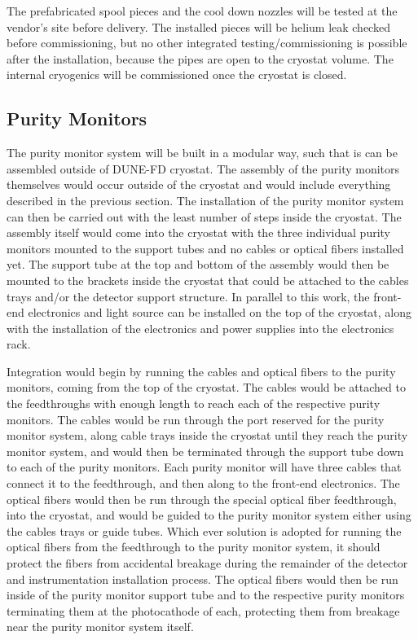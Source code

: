 The prefabricated spool pieces and the cool down nozzles will be tested at the vendor's site before delivery. The installed pieces will be helium leak checked before commissioning, but no other integrated testing/commissioning is possible after the installation, because the pipes are open to the cryostat volume. The internal cryogenics will be commissioned once the cryostat is closed.


\subsection{Purity Monitors}
\label{sec:fdgen-slow-cryo-instal-pm}

The purity monitor system will be built in a modular way, such that is can be assembled outside of DUNE-FD cryostat.  The assembly of the purity monitors themselves would occur outside of the cryostat and would include everything described in the previous section.  The installation of the purity monitor system can then be carried out with the least number of steps inside the cryostat.  The assembly itself would come into the cryostat with the three individual purity monitors mounted to the support tubes and no  cables or optical fibers installed yet.  The support tube at the top and bottom of the assembly would then be mounted to the brackets inside the cryostat that could be attached to the cables trays and/or the detector support structure.  In parallel to this work, the front-end electronics and light source can be installed on the top of the cryostat, along with the installation of the electronics and power supplies into the electronics rack.  

Integration would begin by running the  cables and optical fibers to the purity monitors, coming from the top of the cryostat.  The  cables would be attached to the  feedthroughs with enough length to reach each of the respective purity monitors.  The cables would be run through the port reserved for the purity monitor system, along cable trays inside the cryostat until they reach the purity monitor system, and would then be terminated through the support tube down to each of the purity monitors.  Each purity monitor will have three  cables that connect it to the feedthrough, and then along to the front-end electronics.  The optical fibers would then be run through the special optical fiber feedthrough, into the cryostat, and would be guided to the purity monitor system either using the cables trays or guide tubes.  Which ever solution is adopted for running the optical fibers from the feedthrough to the purity monitor system, it should protect the fibers from accidental breakage during the remainder of the detector and instrumentation installation process.  The optical fibers would then be run inside of the purity monitor support tube and to the respective purity monitors terminating them at the photocathode of each, protecting them from breakage near the purity monitor system itself.


